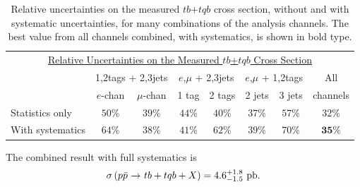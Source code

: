 \begin{table}[!h!tbp]
\begin{center}
\begin{minipage}{5in}
\begin{ruledtabular}
\begin{tabular}{l|cc|cc|cc|c}
  \multicolumn{8}{c}{\hspace{0.5in}\underline{Relative Uncertainties on the Measured $tb$+$tqb$ Cross Section}}\vspace{0.1in}\\
& \multicolumn{2}{c|}{1,2tags + 2,3jets}& \multicolumn{2}{c|}{$e$,$\mu$ + 2,3jets}
& \multicolumn{2}{c|}{$e$,$\mu$ + 1,2tags}& All \\
                 &  $e$-chan & $\mu$-chan& 1 tag & 2 tags& 2 jets& 3 jets&channels\\
\hline
Statistics only  &  $50\%$  & $39\%$ & $44\%$ & $40\%$ &  $37\%$  & $57\%$ & $32\%$     \\
With systematics &  $64\%$  & $38\%$ & $41\%$ & $62\%$ &  $39\%$  & $70\%$ & $\mathbf{35\%}$     \\
\end{tabular}
\end{ruledtabular}
\vspace{-0.1in}
\caption[meas-errors]{Relative uncertainties on the measured
$tb$+$tqb$ cross section, without and with systematic uncertainties,
for many combinations of the analysis channels. The best value from
all channels combined, with systematics, is shown in bold type.}
\label{meas-errors}
\end{minipage}
\end{center}
\end{table}

The combined result with full systematics is
$$
\sigma\left({\mbox{$p\bar{p}$}}{\mbox{ $\rightarrow$ }}tb+tqb+X\right)
= 4.6 ^{+1.8}_{-1.5}~{\rm pb}.
$$


